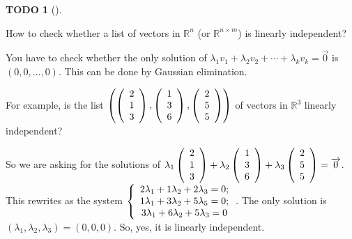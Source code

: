 \documentclass[numbers=enddot,12pt,final,onecolumn,notitlepage]{scrartcl}%
\theoremstyle{definition}
\newtheorem{quest}[theo]{TODO}
\newenvironment{todo}[1][]
{\begin{quest}[#1]\begin{leftbar}}
{\end{leftbar}\end{quest}}
\begin{document}
\begin{todo}
How to check whether a list of vectors in $\mathbb{R}^{n}$ (or $\mathbb{R}%
^{n\times m}$) is linearly independent?

You have to check whether the only solution of $\lambda_{1}v_{1}+\lambda
_{2}v_{2}+\cdots+\lambda_{k}v_{k}=\overrightarrow{0}$ is $\left(
0,0,\ldots,0\right)  $. This can be done by Gaussian elimination.

For example, is the list $\left(  \left(
\begin{array}
[c]{c}%
2\\
1\\
3
\end{array}
\right)  ,\left(
\begin{array}
[c]{c}%
1\\
3\\
6
\end{array}
\right)  ,\left(
\begin{array}
[c]{c}%
2\\
5\\
5
\end{array}
\right)  \right)  $ of vectors in $\mathbb{R}^{3}$ linearly independent?

So we are asking for the solutions of $\lambda_{1}\left(
\begin{array}
[c]{c}%
2\\
1\\
3
\end{array}
\right)  +\lambda_{2}\left(
\begin{array}
[c]{c}%
1\\
3\\
6
\end{array}
\right)  +\lambda_{3}\left(
\begin{array}
[c]{c}%
2\\
5\\
5
\end{array}
\right)  =\overrightarrow{0}$. This rewrites as the system $\left\{
\begin{array}
[c]{c}%
2\lambda_{1}+1\lambda_{2}+2\lambda_{3}=0;\\
1\lambda_{1}+3\lambda_{2}+5\lambda_{5}=0;\\
3\lambda_{1}+6\lambda_{2}+5\lambda_{3}=0
\end{array}
\right.  $. The only solution is $\left(  \lambda_{1},\lambda_{2},\lambda
_{3}\right)  =\left(  0,0,0\right)  $. So, yes, it is linearly independent.
\end{todo}
\end{document}

